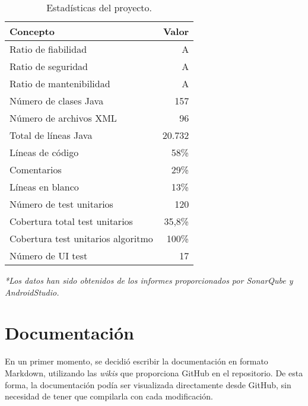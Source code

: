 \begin{table}[H]
\centering
\begin{tabular}{lr}
\toprule
\textbf{Concepto}                  & \multicolumn{1}{r}{\textbf{Valor}} \\ 
\midrule
Ratio de fiabilidad                & A          												\\
Ratio de seguridad                 & A																	\\
Ratio de mantenibilidad						 & A																  \\ 
\midrule
Número de clases Java              & 157                                \\
Número de archivos XML             & 96                                 \\
\midrule
Total de líneas Java               & 20.732                             \\
Líneas de código                   & 58\%            				            \\
Comentarios                        & 29\%          			                \\
Líneas en blanco                   & 13\%    		                        \\
\midrule
Número de test unitarios           & 120																\\
Cobertura total test unitarios     & 35,8\%                             \\
Cobertura test unitarios algoritmo & 100\%                              \\
Número de UI test                  & 17																	\\ 
\bottomrule
\end{tabular}
\caption{Estadísticas del proyecto.}
\label{stats}
\end{table}

\emph{*Los datos han sido obtenidos de los informes proporcionados por SonarQube y AndroidStudio.}

\section{Documentación}\label{aspectos-documentacion}

En un primer momento, se decidió escribir la documentación en formato
Markdown, utilizando las \emph{wikis} que proporciona GitHub en el
repositorio. De esta forma, la documentación podía ser visualizada
directamente desde GitHub, sin necesidad de tener que compilarla con
cada modificación.

